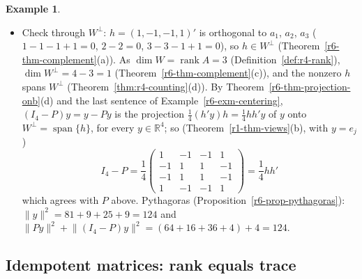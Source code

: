 \documentclass[12pt]{article}
\newcommand{\R}{\mathbb R}
\DeclareMathOperator{\rank}{rank}
\DeclareMathOperator{\Span}{span}
\theoremstyle{definition}
\newtheorem{example}[theorem]{Example}
\begin{document}
\begin{example}
\begin{itemize}
\[(I_4-P)y=y-Py=\begin{pmatrix}1\\-1\\-1\\1\end{pmatrix}
\]
The distance from \(y\) to \(W\) is \(\lVert y-Py\rVert=\sqrt{1+1+1+1}=2\). Check: \(A'(I_4-P)y=(1-1-1+1,\ 2-2,\ 3-3-1+1)'=0\),
and \((Py)'(I_4-P)y=8-4-6+2=0\).
\item Check through \(W^\perp\): \(h=(1,-1,-1,1)'\) is orthogonal to \(a_1\), \(a_2\), \(a_3\) (\(1-1-1+1=0\), \(2-2=0\),
\(3-3-1+1=0\)), so \(h\in W^\perp\) (Theorem~\ref{r6-thm-complement}(a)). As \(\dim W=\rank A=3\)
(Definition~\ref{def:r4-rank}), \(\dim W^\perp=4-3=1\) (Theorem~\ref{r6-thm-complement}(c)), and the nonzero \(h\)
spans \(W^\perp\) (Theorem~\ref{thm:r4-counting}(d)). By Theorem~\ref{r6-thm-projection-onb}(d) and the last sentence
of Example~\ref{r6-exm-centering}, \((I_4-P)y=y-Py\) is the projection \(\frac14(h'y)h=\frac14hh'y\) of \(y\) onto
\(W^\perp=\Span\{h\}\), for every \(y\in\R^4\); so (Theorem~\ref{r1-thm-views}(b), with \(y=e_j\))
\[
I_4-P=\frac14\begin{pmatrix}1&-1&-1&1\\-1&1&1&-1\\-1&1&1&-1\\1&-1&-1&1\end{pmatrix}=\frac14hh'
\]
which agrees with \(P\) above. Pythagoras (Proposition~\ref{r6-prop-pythagoras}): \(\lVert y\rVert^2=81+9+25+9=124\) and
\(\lVert Py\rVert^2+\lVert(I_4-P)y\rVert^2=(64+16+36+4)+4=124\).
\end{itemize}
\end{example}

\subsection*{Idempotent matrices: rank equals trace}
\end{document}
